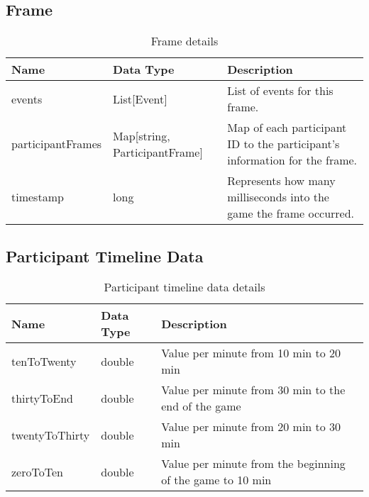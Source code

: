 \FloatBarrier
\subsection{Frame}
\begin{table}[!htb]
\footnotesize
\centering
\begin{tabular}{|llp{5cm}|}
\hline
\textbf{Name}     & \textbf{Data Type}                & \textbf{Description}                                                       \\ \hline
events            & List{[}Event{]}                   & List of events for this frame.                                             \\ \hline
participantFrames & Map{[}string, ParticipantFrame{]} & Map of each participant ID to the participant's information for the frame. \\ \hline
timestamp         & long                              & Represents how many milliseconds into the game the frame occurred.         \\ \hline
\end{tabular}
\caption{Frame details}\label{tab:frame}
\end{table}


\FloatBarrier
\subsection{Participant Timeline Data}
\begin{table}[!htb]
\footnotesize
\centering
\begin{tabular}{|llp{5cm}|}
\hline
Name           & Data Type & Description                                               \\ \hline
tenToTwenty    & double    & Value per minute from 10 min to 20 min                    \\ \hline
thirtyToEnd    & double    & Value per minute from 30 min to the end of the game       \\ \hline
twentyToThirty & double    & Value per minute from 20 min to 30 min                    \\ \hline
zeroToTen      & double    & Value per minute from the beginning of the game to 10 min \\ \hline
\end{tabular}
\caption{Participant timeline data details}\label{tab:part-time-data}
\end{table}


\FloatBarrier

